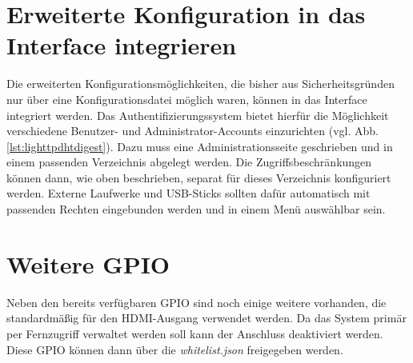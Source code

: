 \section{Erweiterte Konfiguration in das Interface integrieren}
Die erweiterten Konfigurationsmöglichkeiten, die bisher aus Sicherheitsgründen nur über eine Konfigurationsdatei möglich waren, können in das Interface integriert werden. Das Authentifizierungssystem bietet hierfür die Möglichkeit verschiedene Benutzer- und Administrator-Accounts einzurichten (vgl. Abb. \ref{lst:lighttpdhtdigest}). Dazu muss eine Administrationsseite geschrieben und in einem passenden Verzeichnis abgelegt werden. Die Zugriffsbeschränkungen können dann, wie oben beschrieben, separat für dieses Verzeichnis konfiguriert werden. Externe Laufwerke und USB-Sticks sollten dafür automatisch mit passenden Rechten eingebunden werden und in einem Menü auswählbar sein.


\section{Weitere GPIO}
Neben den bereits verfügbaren GPIO sind noch einige weitere vorhanden, die standardmäßig für den HDMI-Ausgang verwendet werden. Da das System primär per Fernzugriff verwaltet werden soll kann der Anschluss deaktiviert werden. Diese GPIO können dann über die \textit{whitelist.json} freigegeben werden.